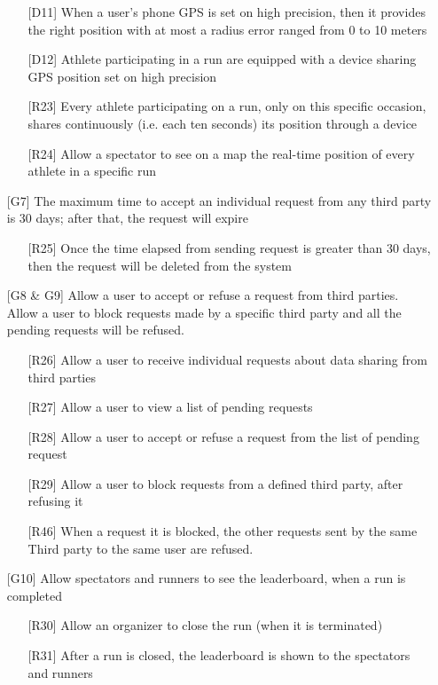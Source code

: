 \begin{itemize}
\begin{itemize}
	\item[{[D11]}] When a user's phone GPS is set on high precision, then it provides the right position with at most a radius error ranged from 0 to 10 meters
	\item[{[D12]}] Athlete participating in a run are equipped with a device sharing GPS position set on high precision
	\item[{[R23]}] Every athlete participating on a run, only on this specific occasion, shares continuously (i.e. each ten seconds) its position through a device
	\item[{[R24]}] Allow a spectator to see on a map the real-time position of every athlete in a specific run
	\end{itemize}
\item[{[G7]}] The maximum time to accept an individual request from any third party is 30 days; after that, the request will expire
	\begin{itemize}
	\item[{[R25]}] Once the time elapsed from sending request is greater than 30 days, then the request will be deleted from the system
	\end{itemize}
\item[{[G8 \& G9]}] Allow a user to accept or refuse a request from third parties. Allow a user to block requests made by a specific third party and all the pending requests will be refused.
	\begin{itemize}
	\item[{[R26]}] Allow a user to receive individual requests about data sharing from third parties
	\item[{[R27]}] Allow a user to view a list of pending requests
	\item[{[R28]}] Allow a user to accept or refuse a request from the list of pending request
	\item[{[R29]}] Allow a user to block requests from a defined third party, after refusing it
	\item[{[R46]}] When a request it is blocked, the other requests sent by the same Third party to the same user are refused.
	\end{itemize}	
\item[{[G10]}] Allow spectators and runners to see the leaderboard, when a run is completed
	\begin{itemize}
	\item[{[R30]}] Allow an organizer to close the run (when it is terminated)
	\item[{[R31]}] After a run is closed, the leaderboard is shown to the spectators and runners

\end{itemize}
\end{itemize}
